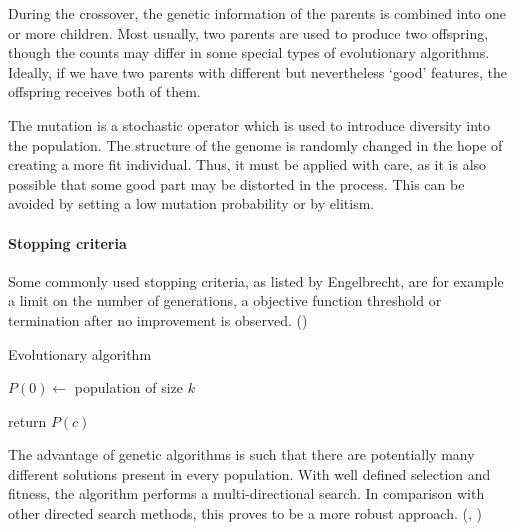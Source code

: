 During the crossover, the genetic information of the parents is combined into
one or more children. Most usually, two parents are used to produce two
offspring, though the counts may differ in some special types of evolutionary
algorithms. Ideally, if we have two parents with different but nevertheless
`good' features, the offspring receives both of them.
\citep{Eiben:2015:IEC:2810085}

The mutation is a stochastic operator which is used to introduce diversity into
the population. The structure of the genome is randomly changed in the hope
of creating a more fit individual. Thus, it must be applied with care, as it is
also possible that some good part may be distorted in the process. This can be
avoided by setting a low mutation probability or by elitism.

\paragraph{Stopping criteria}
Some commonly used stopping criteria, as listed by Engelbrecht, are for example 
a limit on the number of generations, a objective function threshold or
termination after no improvement is observed.
(\citep{Engelbrecht:2007:CII:1557464})

\begin{algorithm} \label{alg:EA}
\DontPrintSemicolon
\caption{Evolutionary algorithm}
  \;
  $P(0) \longleftarrow$ population of size $k$

  \;
  return $P(c)$  
\end{algorithm}

The advantage of genetic algorithms is such that there are potentially 
many different solutions present in every population. With well defined 
selection and fitness, the algorithm performs a multi-directional search. 
In comparison with other directed search methods, this proves to be a more 
robust approach. (\cite{Michalewicz:1996:GAD:229930}, 
\cite{Mitchell:1997:ML:541177}) %

